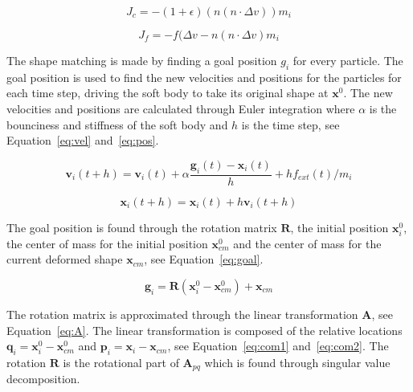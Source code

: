     \begin{equation} \label{eq:col}
        J_c = -(1 + \epsilon)(n(n\cdot{\Delta{v}}))m_i
    \end{equation}

    \begin{equation} \label{eq:fric}
        J_f = -f(\Delta{v} - n(n\cdot{\Delta{v}})m_i
    \end{equation}

    The shape matching is made by finding a goal position $g_i$ for every particle.
    The goal position is used to find the new velocities and positions for the particles for each time step, driving the soft body to take its original shape at $\mathbf{x}^0$.
    The new velocities and positions are calculated through Euler integration where $\alpha$ is the bounciness and stiffness of the soft body and $h$ is the time step, see Equation~\ref{eq:vel} and~\ref{eq:pos}.

    \begin{equation} \label{eq:vel}
        \mathbf{v}_i(t + h) = \mathbf{v}_i(t) + \alpha{\frac{\mathbf{g}_i(t) - \mathbf{x}_i(t)}{h}} + hf_{ext}(t)/m_i
    \end{equation}

    \begin{equation} \label{eq:pos}
        \mathbf{x}_i(t + h) = \mathbf{x}_i(t) + h\mathbf{v}_i(t + h) 
    \end{equation}

    The goal position is found through the rotation matrix $\mathbf{R}$, the initial position $\mathbf{x}^0_i$, the center of mass for the initial position $\mathbf{x}^0_{cm}$ and the center of mass for the current deformed shape $\mathbf{x}_{cm}$, see Equation~\ref{eq:goal}.
   
    \begin{equation}\label{eq:goal}
        \mathbf{g}_i = \mathbf{R}(\mathbf{x}^0_i - \mathbf{x}^0_{cm}) + \mathbf{x}_{cm}
    \end{equation}

    The rotation matrix is approximated through the linear transformation $\mathbf{A}$, see Equation~\ref{eq:A}.
    The linear transformation is composed of the relative locations $\mathbf{q}_i = \mathbf{x}^0_i - \mathbf{x}^0_{cm}$ and $\mathbf{p}_i = \mathbf{x}_i - \mathbf{x}_{cm}$, see Equation~\ref{eq:com1} and~\ref{eq:com2}.
    The rotation $\mathbf{R}$ is the rotational part of $\mathbf{A}_{pq}$ which is found through singular value decomposition.

